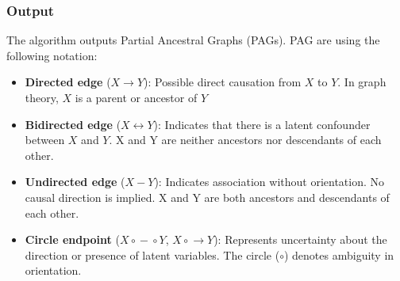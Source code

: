 \documentclass[main.tex]{subfiles}
\begin{document}
\subsubsection{Output}
The algorithm outputs Partial Ancestral Graphs (PAGs). PAG are using the following notation:
\begin{itemize}
        \item \textbf{Directed edge} ($X \rightarrow Y$): Possible direct causation from $X$ to $Y$. In graph theory, $X$ is a parent or ancestor of $Y$
        \item \textbf{Bidirected edge} ($X \leftrightarrow Y$): Indicates that there is a latent confounder between $X$ and $Y$. X and Y are neither ancestors nor descendants of each other.
        \item \textbf{Undirected edge} ($X - Y$): Indicates association without orientation. No causal direction is implied. X and Y are both ancestors and descendants of each other. 
        \item \textbf{Circle endpoint} ($X \circ\!\!-\!\!\circ Y$, $X \circ\!\!\rightarrow Y$): Represents uncertainty about the direction or presence of latent variables. The circle ($\circ$) denotes ambiguity in orientation.
    \end{itemize}
    
\end{document}
